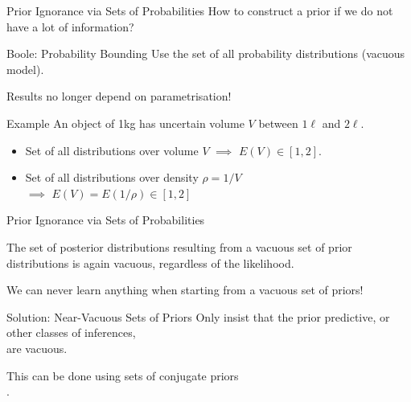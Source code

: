 \documentclass{beamer}
\begin{document}
\begin{frame}{Prior Ignorance via Sets of Probabilities}
   How to construct a prior if we do not have a lot of information?
\pause
  \begin{block}{Boole: Probability Bounding}
    Use the set of all probability distributions (\alert{vacuous model}).
  \end{block}
  Results no longer depend on parametrisation!
\pause
  \begin{exampleblock}{Example}
    An object of 1kg has uncertain volume $V$ between $1\ell$ and $2\ell$.
    \begin{itemize}
    \item<4-> Set of all distributions over volume $V$ $\implies$ $E(V)\in[1,2]$.
    \item<5-> Set of all distributions over density $\rho=1/V$\\
      \hspace*{31ex} $\implies$ $E(V)=E(1/\rho)\in[1,2]$
    \end{itemize}
  \end{exampleblock}
\vspace*{8.25ex}
\end{frame}

\begin{frame}{Prior Ignorance via Sets of Probabilities}
  \begin{theorem}
    The set of posterior distributions
    resulting from a vacuous set of prior distributions
    is again vacuous,
    regardless of the likelihood.
  \end{theorem}
  \alert{We can never learn anything when starting from a vacuous set of priors!}
\pause
  \begin{alertblock}{Solution: Near-Vacuous Sets of Priors}
    Only insist that the prior predictive, or other classes of inferences,\\ are vacuous.
  \end{alertblock}
  This can be done using sets of conjugate priors\\ \parencite{2012:benavolizaffalon,2015:benavolizaffalon}.
\end{frame}
\end{document}
